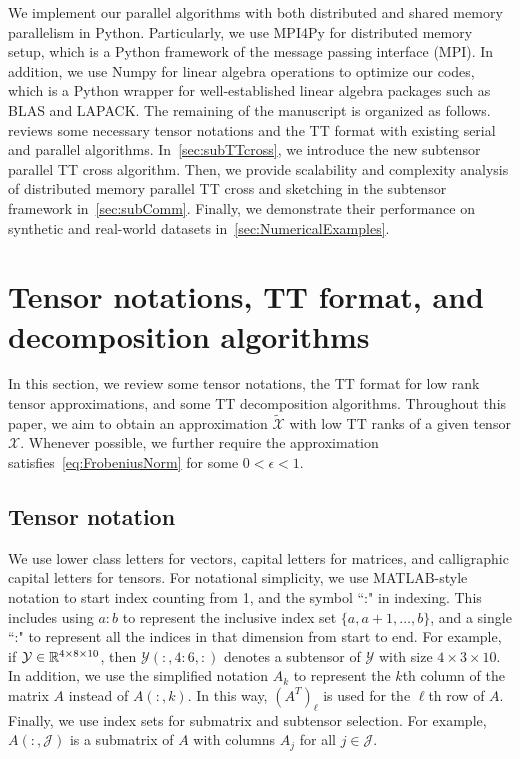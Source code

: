 \documentclass[11pt,a4paper,review]{siamart220329}
\begin{document}
We implement our parallel algorithms with both distributed and shared memory parallelism in Python. Particularly, we use MPI4Py for distributed memory setup, which is a Python framework of the message passing interface (MPI). In addition, we use Numpy for linear algebra operations to optimize our codes, which is a Python wrapper for well-established linear algebra packages such as BLAS and LAPACK. The remaining of the manuscript is organized as follows.~ reviews some necessary tensor notations and the TT format with existing serial and parallel algorithms. In~\cref{sec:subTTcross}, we introduce the new subtensor parallel TT cross algorithm. Then, we provide scalability and complexity analysis of distributed memory parallel TT cross and sketching in the subtensor framework in~\cref{sec:subComm}. Finally, we demonstrate their performance on synthetic and real-world datasets in~\cref{sec:NumericalExamples}. 



\section{Tensor notations, TT format, and decomposition algorithms} \label{sec:background}
In this section, we review some tensor notations, the TT format for low rank tensor approximations, and some TT decomposition algorithms. Throughout this paper, we aim to obtain an approximation $\tilde{\mathcal{X}}$ with low TT ranks of a given tensor $\mathcal{X}$. Whenever possible, we further require the approximation satisfies~\cref{eq:FrobeniusNorm} for some $0 < \epsilon < 1$.

\subsection{Tensor notation} \label{sec:notation}
We use lower class letters for vectors, capital letters for matrices, and calligraphic capital letters for tensors. For notational simplicity, we use MATLAB-style notation to start index counting from 1, and the symbol ``:" in indexing. This includes using $a\!:\!b$ to represent the inclusive index set $\{a,a+1,\ldots,b\}$, and a single ``:" to represent all the indices in that dimension from start to end. For example, if $\mathcal{Y} \in \mathbb{R}^{4 \times 8 \times 10}$, then $\mathcal{Y}(:,4\!:\!6,:)$ denotes a subtensor of $\mathcal{Y}$ with size $4 \times 3 \times 10$. In addition, we use the simplified notation $A_k$ to represent the $k$th column of the matrix $A$ instead of $A(:,k)$. In this way, $(A^T)_\ell$ is used for the $\ell$th row of $A$. Finally, we use index sets for submatrix and subtensor selection. For example, $A(:,\mathcal{J})$ is a submatrix of $A$ with columns $A_j$ for all $j \in \mathcal{J}$.
\end{document}
